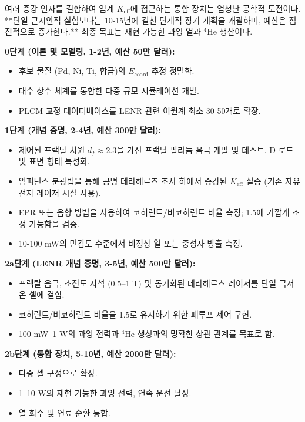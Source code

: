 \documentclass[11pt,a4paper]{article}
\theoremstyle{remark}
\newcommand{\Keff}{K_{\mathrm{eff}}}
\begin{document}
	여러 증강 인자를 결합하여 임계 \(\Keff\)에 접근하는 통합 장치는 엄청난 공학적 도전이다. **단일 근시안적 실험보다는 10-15년에 걸친 단계적 장기 계획을 개괄하며, 예산은 점진적으로 증가한다.** 최종 목표는 재현 가능한 과잉 열과 \(^4\)He 생산이다.
	
	\textbf{0단계 (이론 및 모델링, 1-2년, 예산 50만 달러):}
	\begin{itemize}
		\item 후보 물질 (Pd, Ni, Ti, 합금)의 \(E_{\mathrm{coord}}\) 추정 정밀화.
		\item 대수 상수 체계를 통합한 다중 규모 시뮬레이션 개발.
		\item PLCM 교정 데이터베이스를 LENR 관련 이원계 최소 30-50개로 확장.
	\end{itemize}
	
	\textbf{1단계 (개념 증명, 2-4년, 예산 300만 달러):}
	\begin{itemize}
		\item 제어된 프랙탈 차원 \(d_f \approx 2.3\)을 가진 프랙탈 팔라듐 음극 개발 및 테스트. D 로드 및 표면 형태 특성화.
		\item 임피던스 분광법을 통해 공명 테라헤르츠 조사 하에서 증강된 \(\Keff\) 실증 (기존 자유 전자 레이저 시설 사용).
		\item EPR 또는 음향 방법을 사용하여 코히런트/비코히런트 비율 측정; 1.5에 가깝게 조정 가능함을 검증.
		\item 10-100 mW의 민감도 수준에서 비정상 열 또는 중성자 방출 측정.
	\end{itemize}
	
	\textbf{2a단계 (LENR 개념 증명, 3-5년, 예산 500만 달러):}
	\begin{itemize}
		\item 프랙탈 음극, 초전도 자석 (0.5–1 T) 및 동기화된 테라헤르츠 레이저를 단일 극저온 셀에 결합.
		\item 코히런트/비코히런트 비율을 1.5로 유지하기 위한 폐루프 제어 구현.
		\item 100 mW–1 W의 과잉 전력과 \(^4\)He 생성과의 명확한 상관 관계를 목표로 함.
	\end{itemize}
	
	\textbf{2b단계 (통합 장치, 5-10년, 예산 2000만 달러):}
	\begin{itemize}
		\item 다중 셀 구성으로 확장.
		\item 1–10 W의 재현 가능한 과잉 전력, 연속 운전 달성.
		\item 열 회수 및 연료 순환 통합.
	\end{itemize}
	
\end{document}
